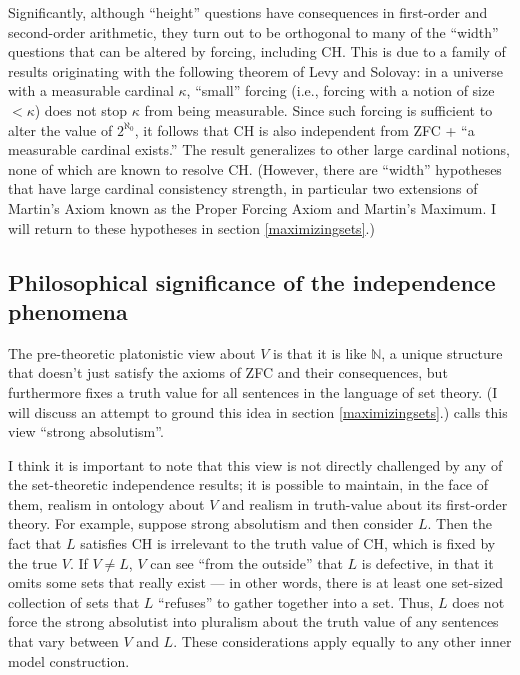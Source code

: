 \documentclass[letterpaper,12pt]{article}
\begin{document}
Significantly, although ``height'' questions have consequences in first-order and second-order arithmetic, they turn out to be orthogonal to many of the ``width'' questions that can be altered by forcing, including CH. This is due to a family of results originating with the following theorem of Levy and Solovay: in a universe with a measurable cardinal $\kappa$, ``small'' forcing (i.e., forcing with a notion of size $< \kappa$) does not stop $\kappa$ from being measurable. Since such forcing is sufficient to alter the value of $2^{\aleph_0}$, it follows that CH is also independent from ZFC + ``a measurable cardinal exists.'' The result generalizes to other large cardinal notions, none of which are known to resolve CH. (However, there are ``width'' hypotheses that have large cardinal consistency strength, in particular two extensions of Martin's Axiom known as the Proper Forcing Axiom and Martin's Maximum. I will return to these hypotheses in section \ref{maximizingsets}.)

\subsection{Philosophical significance of the independence phenomena}
\label{philosophicalsignificance}
The pre-theoretic platonistic view about $V$ is that it is like $\mathbb{N}$, a unique structure that doesn't just satisfy the axioms of ZFC and their consequences, but furthermore fixes a truth value for all sentences in the language of set theory. (I will discuss an attempt to ground this idea in section \ref{maximizingsets}.) \cite{steel2012godel} calls this view ``strong absolutism''.

I think it is important to note that this view is not directly challenged by any of the set-theoretic independence results; it is possible to maintain, in the face of them, realism in ontology about $V$ and realism in truth-value about its first-order theory. For example, suppose strong absolutism and then consider $L$. Then the fact that $L$ satisfies CH is irrelevant to the truth value of CH, which is fixed by the true $V$. If $V \not = L$, $V$ can see ``from the outside'' that $L$ is defective, in that it omits some sets that really exist --- in other words, there is at least one set-sized collection of sets that $L$ ``refuses'' to gather together into a set. Thus, $L$ does not force the strong absolutist into pluralism about the truth value of any sentences that vary between $V$ and $L$. These considerations apply equally to any other inner model construction.
\end{document}
